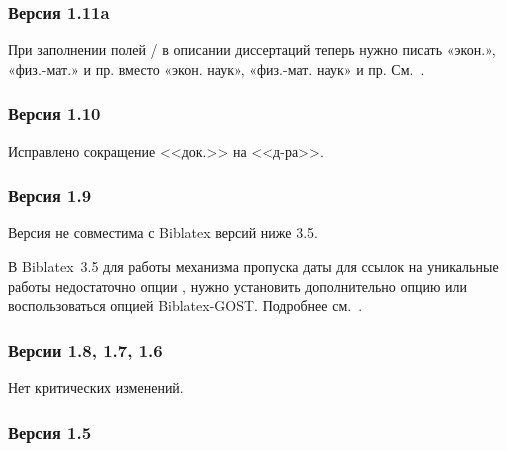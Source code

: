 \documentclass[10pt,a4paper,headings=small,numbers=enddot,english,russian]{ltxdockit}
\newcommand*{\biblatex}{Biblatex\xspace}
\newcommand*{\biblatexgost}{Biblatex-GOST\xspace}
\begin{document}
\subsubsection*{Версия 1.11a}

\begin{trivlist}
\item При заполнении полей / в описании диссертаций
  теперь нужно писать «экон.», «физ.-мат.» и пр. вместо «экон. наук», «физ.-мат. наук» и
  пр. См.~.
\end{trivlist}

\subsubsection*{Версия 1.10}

\begin{trivlist}
\item Исправлено сокращение <<док.>> на <<д-ра>>.
\end{trivlist}

\subsubsection*{Версия 1.9}

\begin{trivlist}
\item Версия не совместима с \biblatex версий ниже 3.5.
\item В \biblatex~3.5 для работы механизма пропуска даты для ссылок на уникальные работы
  недостаточно опции , нужно установить дополнительно опцию
   или воспользоваться опцией \biblatexgost {}.
  Подробнее см.~. 
\end{trivlist}

\subsubsection*{Версии 1.8, 1.7, 1.6}

\begin{trivlist}
\item Нет критических изменений.
\end{trivlist}

\subsubsection*{Версия 1.5}
\end{document}
